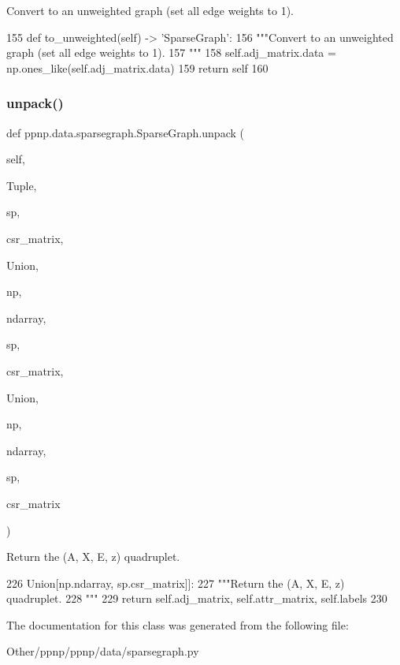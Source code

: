 \begin{DoxyVerb}Convert to an unweighted graph (set all edge weights to 1).
\end{DoxyVerb}
 
\begin{DoxyCode}
155     \textcolor{keyword}{def }to\_unweighted(self) -> 'SparseGraph':
156         \textcolor{stringliteral}{"""Convert to an unweighted graph (set all edge weights to 1).}
157 \textcolor{stringliteral}{        """}
158         self.adj\_matrix.data = np.ones\_like(self.adj\_matrix.data)
159         \textcolor{keywordflow}{return} self
160 
\end{DoxyCode}
\mbox{\label{classppnp_1_1data_1_1sparsegraph_1_1SparseGraph_a99926aa314ef58104e923043c070def2}} 
\subsubsection{\texorpdfstring{unpack()}{unpack()}}
{\footnotesize\ttfamily def ppnp.\+data.\+sparsegraph.\+Sparse\+Graph.\+unpack (\begin{DoxyParamCaption}\item[{}]{self,  }\item[{}]{Tuple,  }\item[{}]{sp,  }\item[{}]{csr\+\_\+matrix,  }\item[{}]{Union,  }\item[{}]{np,  }\item[{}]{ndarray,  }\item[{}]{sp,  }\item[{}]{csr\+\_\+matrix,  }\item[{}]{Union,  }\item[{}]{np,  }\item[{}]{ndarray,  }\item[{}]{sp,  }\item[{}]{csr\+\_\+matrix }\end{DoxyParamCaption})}

\begin{DoxyVerb}Return the (A, X, E, z) quadruplet.
\end{DoxyVerb}
 
\begin{DoxyCode}
226                               Union[np.ndarray, sp.csr\_matrix]]:
227         \textcolor{stringliteral}{"""Return the (A, X, E, z) quadruplet.}
228 \textcolor{stringliteral}{        """}
229         \textcolor{keywordflow}{return} self.adj\_matrix, self.attr\_matrix, self.labels
230 
\end{DoxyCode}


The documentation for this class was generated from the following file\+:\begin{DoxyCompactItemize}
\item 
Other/ppnp/ppnp/data/sparsegraph.\+py\end{DoxyCompactItemize}
